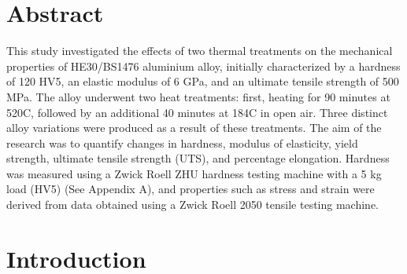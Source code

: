 \documentclass{article}
\begin{document}
    \large\newpage\vspace*{-20pt}

    \section{Abstract}
    \vspace*{1em}
    This study investigated the effects of two thermal treatments on the mechanical properties of HE30/BS1476 aluminium alloy, initially characterized by a hardness of 120 HV5, an elastic modulus of 6 GPa, and an ultimate tensile strength of 500 MPa. The alloy underwent two heat treatments: first, heating for 90 minutes at 520\textdegree C, followed by an additional 40 minutes at 184\textdegree C in open air. Three distinct alloy variations were produced as a result of these treatments. The aim of the research was to quantify changes in hardness, modulus of elasticity, yield strength, ultimate tensile strength (UTS), and percentage elongation. Hardness was measured using a Zwick Roell ZHU hardness testing machine with a 5 kg load (HV5) (See Appendix A), and properties such as stress and strain were derived from data obtained using a Zwick Roell 2050 tensile testing machine.
   
    
    \newpage\vspace*{-20pt}
    \section{Introduction}
\end{document}
